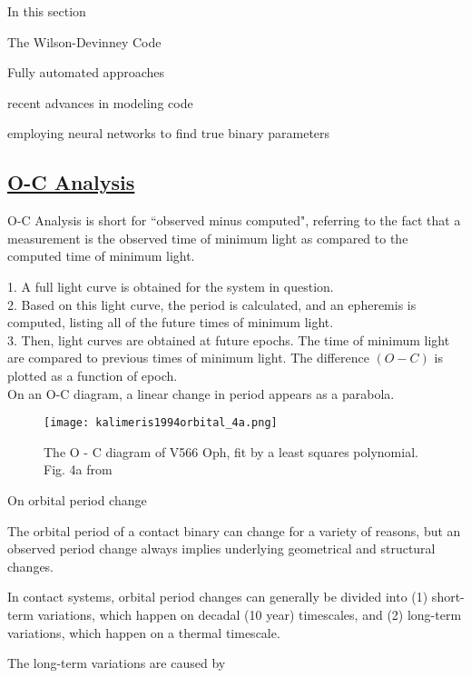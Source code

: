 \documentclass[12pt]{article} %
\numberwithin{equation}{section} %
\begin{document}
In this section 

The Wilson-Devinney Code 

Fully automated approaches \citep{prsa2009fully} \citep{prsa2008artificial}

recent advances in modeling code \citep{prvsa2013physics}

employing neural networks to find true binary parameters \citep{zeraatgari2015neural}

\subsection[O-C Analysis]{\hyperlink{toc}{O-C Analysis}} \label{sec: O-C Analysis}

O-C Analysis is short for ``observed minus computed", referring to the fact that a measurement is the observed time of minimum light as compared to the computed time of minimum light. 

1. A full light curve is obtained for the system in question. \\
2. Based on this light curve, the period is calculated, and an epheremis is computed, listing all of the future times of minimum light. \\
3. Then, light curves are obtained at future epochs. The time of minimum light are compared to previous times of minimum light. The difference $(O-C)$ is plotted as a function of epoch. \\

On an O-C diagram, a linear change in period appears as a parabola.

\begin{figure}[H]
\centering
\texttt{[image: kalimeris1994orbital\_4a.png]}
\caption{ The O - C diagram of V566 Oph, fit by a least squares polynomial. Fig. 4a from \citet{kalimeris1994orbital}}
\label{fig: kalimeris1994orbital_4a}
\end{figure}

On orbital period change \citep{kalimeris1994orbital}

The orbital period of a contact binary can change for a variety of reasons, but an observed period change always implies underlying geometrical and structural changes.

In contact systems, orbital period changes can generally be divided into (1) short-term variations, which happen on decadal (10 year) timescales, and (2) long-term variations, which happen on a thermal timescale.

The long-term variations are caused by
\end{document}
